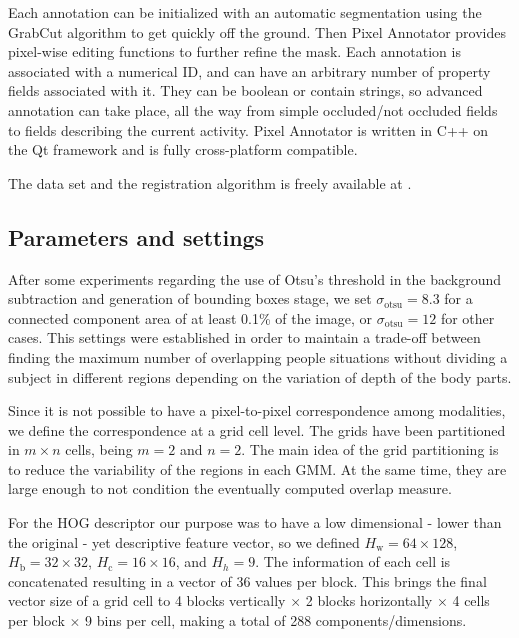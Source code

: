 \documentclass[10pt,twocolumn,letterpaper]{article}
\begin{document}
Each annotation can be initialized with an automatic segmentation using the GrabCut algorithm \cite{rother2004grabcut} to get quickly off the ground. Then Pixel Annotator provides pixel-wise editing functions to further refine the mask. Each annotation is associated with a numerical ID, and can have an arbitrary number of property fields associated with it. They can be boolean or contain strings, so advanced annotation can take place, all the way from simple occluded/not occluded fields to fields describing the current activity. Pixel Annotator is written in C++ on the Qt framework and is fully cross-platform compatible.

The data set and the registration algorithm is freely available at \cite{vapgroup}.

\subsection{Parameters and settings}
\label{ssec:parametersandsettings}

After some experiments regarding the use of Otsu's threshold in the background subtraction and generation of bounding boxes stage, we set $\sigma_\text{otsu} = 8.3$ for a connected component area of at least 0.1\% of the image, or  $\sigma_\text{otsu} = 12$ for other cases. This settings were established in order to maintain a trade-off between finding the maximum number of overlapping people situations without dividing a subject in different regions depending on the variation of depth of the body parts.

Since it is not possible to have a pixel-to-pixel correspondence among modalities, we define the correspondence at a grid cell level. The grids have been partitioned in $m \times n$ cells, being $m = 2$ and $n = 2$. The main idea of the grid partitioning is to reduce the variability of the regions in each GMM. At the same time, they are large enough to not condition the eventually computed overlap measure.

For the HOG descriptor our purpose was to have a low dimensional - lower than the original - yet descriptive feature vector, so we defined $H_\text{w} = 64 \times 128$, $H_\text{b} = 32 \times 32$, $H_\text{c}=16 \times 16$, and $H_{h} = 9$. The information of each cell is concatenated resulting in a vector of 36 values per block. This brings the final vector size of a grid cell to 4 blocks vertically $\times$ 2 blocks horizontally $\times$ 4 cells per block $\times$ 9 bins per cell, making a total of 288 components/dimensions. 
\end{document}
